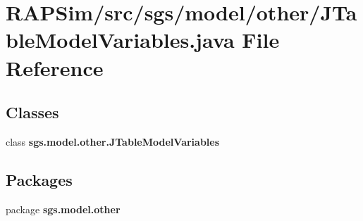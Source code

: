 \section{R\-A\-P\-Sim/src/sgs/model/other/\-J\-Table\-Model\-Variables.java File Reference}
\label{_j_table_model_variables_8java}
\subsection*{Classes}
\begin{DoxyCompactItemize}
\item 
class {\bf sgs.\-model.\-other.\-J\-Table\-Model\-Variables}
\end{DoxyCompactItemize}
\subsection*{Packages}
\begin{DoxyCompactItemize}
\item 
package {\bf sgs.\-model.\-other}
\end{DoxyCompactItemize}
